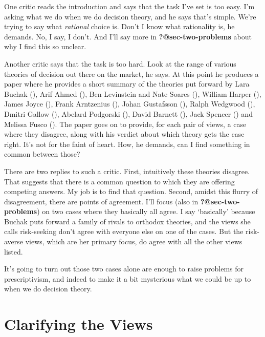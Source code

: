 \documentclass[
  11pt,
  letterpaper,
  DIV=11,
  numbers=noendperiod,
  twoside]{scrartcl}
\begin{document}
One critic reads the introduction and says that the task I've set is too
easy. I'm asking what we do when we do decision theory, and he says
that's simple. We're trying to say what \emph{rational} choice is. Don't
I know what rationality is, he demands. No, I say, I don't. And I'll say
more in \textbf{?@sec-two-problems} about why I find this so unclear.

Another critic says that the task is too hard. Look at the range of
various theories of decision out there on the market, he says. At this
point he produces a paper where he provides a short summary of the
theories put forward by Lara Buchak (),
Arif Ahmed (), Ben Levinstein and Nate
Soares (), William Harper
(), James Joyce
(), Frank Arntzenius
(), Johan Gustafsson
(), Ralph Wedgwood
(), Dmitri Gallow
(), Abelard Podgorski
(), David Barnett
(), Jack Spencer
() and Melissa Fusco
(). The paper goes on to provide, for each
pair of views, a case where they disagree, along with his verdict about
which theory gets the case right. It's not for the faint of heart. How,
he demands, can I find something in common between those?

There are two replies to such a critic. First, intuitively these
theories disagree. That suggests that there is a common question to
which they are offering competing answers. My job is to find that
question. Second, amidst this flurry of disagreement, there are points
of agreement. I'll focus (also in \textbf{?@sec-two-problems}) on two
cases where they basically all agree. I say `basically' because Buchak
puts forward a family of rivals to orthodox theories, and the views she
calls risk-seeking don't agree with everyone else on one of the cases.
But the risk-averse views, which are her primary focus, do agree with
all the other views listed.

It's going to turn out those two cases alone are enough to raise
problems for prescriptivism, and indeed to make it a bit mysterious what
we could be up to when we do decision theory.

\section{Clarifying the Views}\label{sec-clarify}
\end{document}
